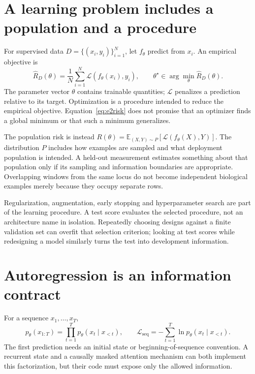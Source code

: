 \section{A learning problem includes a population and a procedure}
For supervised data $D=\{(x_i,y_i)\}_{i=1}^{N}$, let $f_\theta$ predict from $x_i$. An empirical objective is
\begin{equation}
\widehat R_D(\theta)=\frac1N\sum_{i=1}^{N}
\mathcal L(f_\theta(x_i),y_i),\qquad
\theta^\star\in\arg\min_\theta\widehat R_D(\theta).
\label{eq:e2risk}
\end{equation}
The parameter vector $\theta$ contains trainable quantities; $\mathcal L$ penalizes a prediction relative to its target. Optimization is a procedure intended to reduce the empirical objective. Equation~\ref{eq:e2risk} does not promise that an optimizer finds a global minimum or that such a minimum generalizes.

The population risk is instead $R(\theta)=\mathbb E_{(X,Y)\sim P}[\mathcal L(f_\theta(X),Y)]$. The distribution $P$ includes how examples are sampled and what deployment population is intended. A held-out measurement estimates something about that population only if its sampling and information boundaries are appropriate. Overlapping windows from the same locus do not become independent biological examples merely because they occupy separate rows.

Regularization, augmentation, early stopping and hyperparameter search are part of the learning procedure. A test score evaluates the selected procedure, not an architecture name in isolation. Repeatedly choosing designs against a finite validation set can overfit that selection criterion;\cite{e2cawley} looking at test scores while redesigning a model similarly turns the test into development information.

\section{Autoregression is an information contract}
For a sequence $x_1,\ldots,x_T$,
\[
p_\theta(x_{1:T})=\prod_{t=1}^{T}
p_\theta(x_t\mid x_{<t}),\qquad
\mathcal L_{\mathrm{seq}}=-\sum_{t=1}^{T}
\ln p_\theta(x_t\mid x_{<t}).
\]
The first prediction needs an initial state or beginning-of-sequence convention. A recurrent state and a causally masked attention mechanism can both implement this factorization, but their code must expose only the allowed information.\cite{attention}


